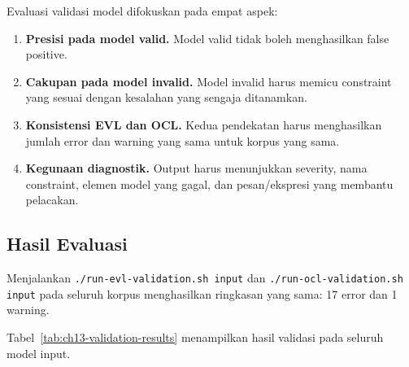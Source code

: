 Evaluasi validasi model difokuskan pada empat aspek:
\begin{enumerate}
  \item \textbf{Presisi pada model valid.} Model valid tidak boleh menghasilkan false positive.
  \item \textbf{Cakupan pada model invalid.} Model invalid harus memicu constraint yang sesuai dengan kesalahan yang sengaja ditanamkan.
  \item \textbf{Konsistensi EVL dan OCL.} Kedua pendekatan harus menghasilkan jumlah error dan warning yang sama untuk korpus yang sama.
  \item \textbf{Kegunaan diagnostik.} Output harus menunjukkan severity, nama constraint, elemen model yang gagal, dan pesan/ekspresi yang membantu pelacakan.
\end{enumerate}

\subsection{Hasil Evaluasi}

Menjalankan \texttt{./run-evl-validation.sh input} dan \texttt{./run-ocl-validation.sh input} pada seluruh korpus menghasilkan ringkasan yang sama: 17 error dan 1 warning.


Tabel~\ref{tab:ch13-validation-results} menampilkan hasil validasi pada seluruh model input.
\begin{table}[h]
\centering
\caption{Hasil validasi pada seluruh model input}
\label{tab:ch13-validation-results}
\footnotesize
{}
\normalsize
\end{table}

